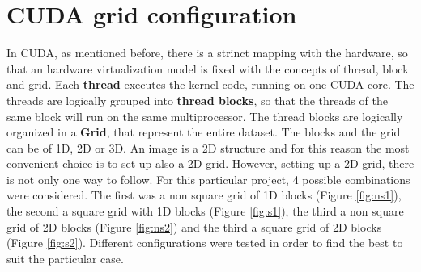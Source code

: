 \documentclass[a4paper]{article}
\begin{document}
\section{CUDA grid configuration}
\label{sec:grid}
In CUDA, as mentioned before, there is a strinct mapping with the hardware, so that an hardware virtualization model is fixed with the concepts of thread, block and grid.
Each \textbf{thread} executes the kernel code, running on one CUDA core.
The threads are logically grouped into \textbf{thread blocks}, so that the threads of the same block will run on the same multiprocessor. The thread blocks are logically organized in a \textbf{Grid}, that represent the entire dataset. The blocks and the grid can be of 1D, 2D or 3D.
An image is a 2D structure and for this reason the most convenient choice is to set up also a 2D grid. However, setting up a 2D grid, there is not only one way to follow. For this particular project, 4 possible combinations were considered. The first was a non square grid of 1D blocks (Figure \ref{fig:ns1}), the second a square grid with 1D blocks (Figure \ref{fig:s1}), the third a non square grid of 2D blocks (Figure \ref{fig:ns2}) and the third a square grid of 2D blocks (Figure \ref{fig:s2}). Different configurations were tested in order to find the best to suit the particular case.
\end{document}
